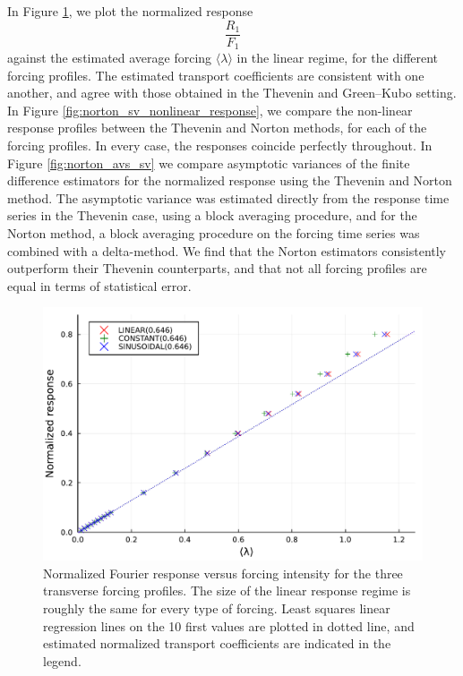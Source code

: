 In Figure \ref{fig:norton_sv_linear_response}, we plot the normalized response \[\frac{R_1}{F_1}\] against the estimated average forcing $\langle \lambda \rangle$ in the linear regime, for the different forcing profiles.
The estimated transport coefficients are consistent with one another, and agree with those obtained in the Thevenin and Green--Kubo setting.
In Figure \ref{fig:norton_sv_nonlinear_response}, we compare the non-linear response profiles between the Thevenin and Norton methods, for each of the forcing profiles. In every case, the responses coincide perfectly throughout.
In Figure \ref{fig:norton_avs_sv} we compare asymptotic variances of the finite difference estimators for the normalized response using the Thevenin and Norton method. The asymptotic variance was estimated directly from the response time series in the Thevenin case, using a block averaging procedure,
and for the Norton method, a block averaging procedure on the forcing time series was combined with a delta-method. We find that the Norton estimators consistently outperform their Thevenin counterparts, and that not all forcing profiles are equal in terms of statistical error.
\begin{figure}[htbp]
  \begin{center}
    \includegraphics[width=0.9\linewidth]{figures/norton_sv_lin.pdf}
    \caption{ \label{fig:norton_sv_linear_response}
      Normalized Fourier response versus forcing intensity for the three transverse forcing profiles.
      The size of the linear response regime is roughly the same for every type of forcing. Least squares linear regression lines on the 10 first values are plotted in dotted line, and estimated normalized transport coefficients are indicated in the legend.
    }
  \end{center}
\end{figure}
